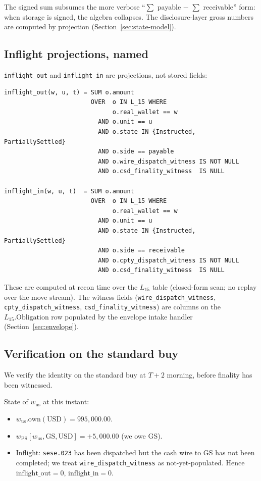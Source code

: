 \documentclass[11pt,a4paper]{article}
\begin{document}
The signed sum subsumes the more verbose ``$\sum$ payable $-$ $\sum$ receivable'' form: when storage is signed, the algebra collapses. The disclosure-layer gross numbers are computed by projection (Section~\ref{sec:state-model}).

\subsection{Inflight projections, named}
\label{sec:reconciliation-inflight}

\texttt{inflight\_out} and \texttt{inflight\_in} are projections, not stored fields:

\begin{lstlisting}
inflight_out(w, u, t) = SUM o.amount
                        OVER  o IN L_15 WHERE
                              o.real_wallet == w
                          AND o.unit == u
                          AND o.state IN {Instructed, PartiallySettled}
                          AND o.side == payable
                          AND o.wire_dispatch_witness IS NOT NULL
                          AND o.csd_finality_witness  IS NULL

inflight_in(w, u, t)  = SUM o.amount
                        OVER  o IN L_15 WHERE
                              o.real_wallet == w
                          AND o.unit == u
                          AND o.state IN {Instructed, PartiallySettled}
                          AND o.side == receivable
                          AND o.cpty_dispatch_witness IS NOT NULL
                          AND o.csd_finality_witness  IS NULL
\end{lstlisting}

These are computed at recon time over the $L_{15}$ table (closed-form scan; no replay over the move stream). The witness fields (\texttt{wire\_dispatch\_witness}, \texttt{cpty\_dispatch\_witness}, \texttt{csd\_finality\_witness}) are columns on the $L_{15}.\mathrm{Obligation}$ row populated by the envelope intake handler (Section~\ref{sec:envelope}).

\subsection{Verification on the standard buy}
\label{sec:reconciliation-verification}

We verify the identity on the standard buy at $T+2$ morning, before finality has been witnessed.

State of $w_{\mathrm{us}}$ at this instant:
\begin{itemize}[nosep]
\item $w_{\mathrm{us}}.\mathrm{own}(\mathrm{USD}) = 995{,}000.00$.
\item $w_{\mathrm{PS}}[w_{\mathrm{us}}, \mathrm{GS}, \mathrm{USD}] = +5{,}000.00$ (we owe GS).
\item Inflight: \texttt{sese.023} has been dispatched but the cash wire to GS has not been completed; we treat \texttt{wire\_dispatch\_witness} as not-yet-populated. Hence $\mathrm{inflight\_out} = 0$, $\mathrm{inflight\_in} = 0$.
\end{itemize}
\end{document}
